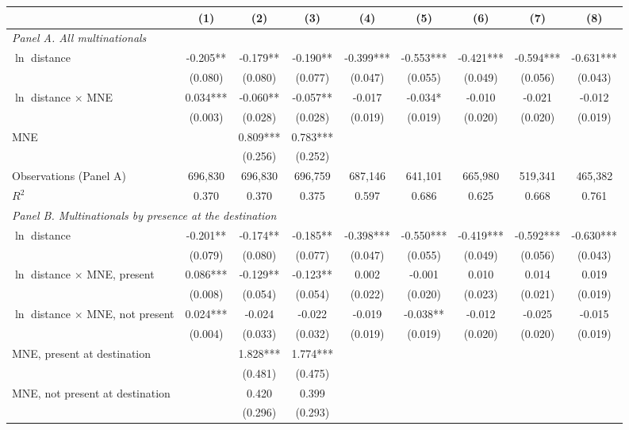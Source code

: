 \begin{tabular}{l*{8}{c}}
\toprule
 & (1) & (2) & (3) & (4) & (5) & (6) & (7) & (8) \\
\midrule
\multicolumn{9}{l}{\textit{Panel A. All multinationals}} \\
$\ln$ distance & -0.205** & -0.179** & -0.190** & -0.399*** & -0.553*** & -0.421*** & -0.594*** & -0.631*** \\
 & (0.080) & (0.080) & (0.077) & (0.047) & (0.055) & (0.049) & (0.056) & (0.043) \\
$\ln$ distance $\times$ MNE & 0.034*** & -0.060** & -0.057** & -0.017 & -0.034* & -0.010 & -0.021 & -0.012 \\
 & (0.003) & (0.028) & (0.028) & (0.019) & (0.019) & (0.020) & (0.020) & (0.019) \\
MNE &  & 0.809*** & 0.783*** &  &  &  &  &  \\
 &  & (0.256) & (0.252) &  &  &  &  &  \\
Observations (Panel A) & 696,830 & 696,830 & 696,759 & 687,146 & 641,101 & 665,980 & 519,341 & 465,382 \\
$R^2$ & 0.370 & 0.370 & 0.375 & 0.597 & 0.686 & 0.625 & 0.668 & 0.761 \\
\midrule
\multicolumn{9}{l}{\textit{Panel B. Multinationals by presence at the destination}} \\
$\ln$ distance & -0.201** & -0.174** & -0.185** & -0.398*** & -0.550*** & -0.419*** & -0.592*** & -0.630*** \\
 & (0.079) & (0.080) & (0.077) & (0.047) & (0.055) & (0.049) & (0.056) & (0.043) \\
$\ln$ distance $\times$ MNE, present & 0.086*** & -0.129** & -0.123** & 0.002 & -0.001 & 0.010 & 0.014 & 0.019 \\
 & (0.008) & (0.054) & (0.054) & (0.022) & (0.020) & (0.023) & (0.021) & (0.019) \\
$\ln$ distance $\times$ MNE, not present & 0.024*** & -0.024 & -0.022 & -0.019 & -0.038** & -0.012 & -0.025 & -0.015 \\
 & (0.004) & (0.033) & (0.032) & (0.019) & (0.019) & (0.020) & (0.020) & (0.019) \\
MNE, present at destination &  & 1.828*** & 1.774*** &  &  &  &  &  \\
 &  & (0.481) & (0.475) &  &  &  &  &  \\
MNE, not present at destination &  & 0.420 & 0.399 &  &  &  &  &  \\
 &  & (0.296) & (0.293) &  &  &  &  &  \\

\end{tabular}
